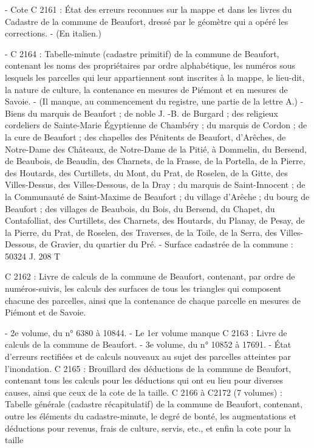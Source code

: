 \documentclass[12pt,a4paper]{report}
\begin{document}
- Cote C 2161 : État des erreurs reconnues sur la mappe et dans les livres du Cadastre de la commune de Beaufort, dressé par le géomètre qui a opéré les corrections. - (En italien.)

- C 2164 : Tabelle-minute (cadastre primitif) de la commune de Beaufort, contenant les noms des propriétaires par ordre alphabétique, les numéros sous lesquels les parcelles qui leur appartiennent sont inscrites à la mappe, le lieu-dit, la nature de culture, la contenance en mesures de Piémont et en mesures de Savoie. - (Il manque, au commencement du registre, une partie de la lettre A.) - Biens du marquis de Beaufort ; de noble J. -B. de Burgard ; des religieux cordeliers de Sainte-Marie Égyptienne de Chambéry ; du marquis de Cordon ; de la cure de Beaufort ; des chapelles des Pénitents de Beaufort, d’Arêches, de Notre-Dame des Châteaux, de Notre-Dame de la Pitié, à Dommelin, du Bersend, de Beaubois, de Beaudin, des Charnets, de la Frasse, de la Portella, de la Pierre, des Houtards, des Curtillets, du Mont, du Prat, de Roselen, de la Gitte, des Villes-Dessus, des Villes-Dessous, de la Dray ; du marquis de Saint-Innocent ; de la Communauté de Saint-Maxime de Beaufort ; du village d’Arêche ; du bourg de Beaufort ; des villages de Beaubois, du Bois, du Bersend, du Chapet, du Contafolliat, des Curtillets, des Charnets, des Houtards, du Planay, de Pesay, de la Pierre, du Prat, de Roselen, des Traverses, de la Toile, de la Serra, des Villes-Dessous, de Gravier, du quartier du Pré. - Surface cadastrée de la commune : 50324 J. 208 T

C 2162 : Livre de calculs de la commune de Beaufort, contenant, par ordre de numéros-suivis, les calculs des surfaces de tous les triangles qui composent chacune des parcelles, ainsi que la contenance de chaque parcelle en mesures de Piémont et de Savoie.

- 2e volume, du n° 6380 à 10844. - Le 1er volume manque
C 2163 : Livre de calculs de la commune de Beaufort. - 3e volume, du n° 10852 à 17691. - État d’erreurs rectifiées et de calculs nouveaux au sujet des parcelles atteintes par l’inondation.
C 2165 : Brouillard des déductions de la commune de Beaufort, contenant tous les calculs pour les déductions qui ont eu lieu pour diverses causes, ainsi que ceux de la cote de la taille.
C 2166 à C2172 (7 volumes) : Tabelle générale (cadastre récapitulatif) de la commune de Beaufort, contenant, outre les éléments du cadastre-minute, le degré de bonté, les augmentations et déductions pour revenus, frais de culture, servis, etc., et enfin la cote pour la taille
\end{document}
